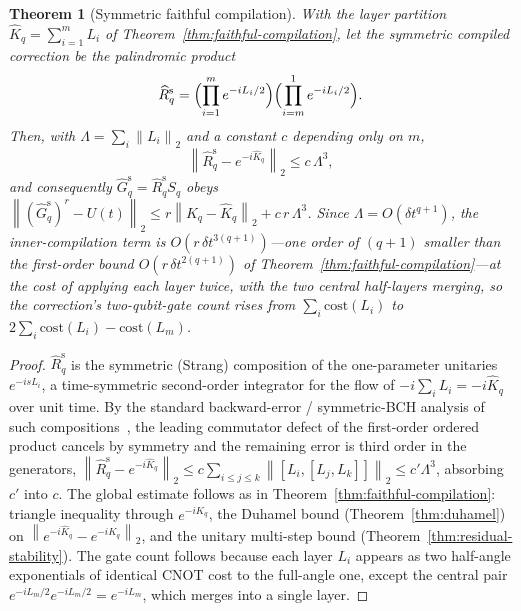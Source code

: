 \documentclass[aps,prresearch,reprint,superscriptaddress,nofootinbib,amsmath,amssymb]{revtex4-2}
\newcommand{\norm}[1]{\left\lVert #1 \right\rVert}
\newcommand{\dt}{\delta t}
\newtheorem{theorem}{Theorem}
\begin{document}
\begin{theorem}[Symmetric faithful compilation]
\label{thm:symmetric-compilation}
With the layer partition $\widehat K_q=\sum_{i=1}^{m}L_i$ of Theorem~\ref{thm:faithful-compilation}, let the \emph{symmetric} compiled correction be the palindromic product
\begin{equation}
    \widehat R_q^{\mathrm{s}}=\Bigl(\prod_{i=1}^{m}e^{-iL_i/2}\Bigr)\Bigl(\prod_{i=m}^{1}e^{-iL_i/2}\Bigr).
\end{equation}
Then, with $\Lambda=\sum_i\norm{L_i}_2$ and a constant $c$ depending only on $m$,
\begin{equation}
    \norm{\widehat R_q^{\mathrm{s}}-e^{-i\widehat K_q}}_2\leq c\,\Lambda^3 ,
\end{equation}
and consequently $\widehat G_q^{\mathrm{s}}=\widehat R_q^{\mathrm{s}}S_q$ obeys $\norm{(\widehat G_q^{\mathrm{s}})^{r}-U(t)}_2\leq r\norm{K_q-\widehat K_q}_2+c\,r\,\Lambda^3$. Since $\Lambda=O(\dt^{q+1})$, the inner-compilation term is $O(r\,\dt^{3(q+1)})$---one order of $(q+1)$ smaller than the first-order bound $O(r\,\dt^{2(q+1)})$ of Theorem~\ref{thm:faithful-compilation}---at the cost of applying each layer twice, with the two central half-layers merging, so the correction's two-qubit-gate count rises from $\sum_i\mathrm{cost}(L_i)$ to $2\sum_i\mathrm{cost}(L_i)-\mathrm{cost}(L_m)$.
\end{theorem}

\begin{proof}
$\widehat R_q^{\mathrm{s}}$ is the symmetric (Strang) composition of the one-parameter unitaries $e^{-isL_i}$, a time-symmetric second-order integrator for the flow of $-i\sum_iL_i=-i\widehat K_q$ over unit time. By the standard backward-error / symmetric-BCH analysis of such compositions~\cite{blanes2009}, the leading commutator defect of the first-order ordered product cancels by symmetry and the remaining error is third order in the generators, $\norm{\widehat R_q^{\mathrm{s}}-e^{-i\widehat K_q}}_2\leq c\sum_{i\leq j\leq k}\norm{[L_i,[L_j,L_k]]}_2\leq c'\Lambda^3$, absorbing $c'$ into $c$. The global estimate follows as in Theorem~\ref{thm:faithful-compilation}: triangle inequality through $e^{-i\widehat K_q}$, the Duhamel bound (Theorem~\ref{thm:duhamel}) on $\norm{e^{-i\widehat K_q}-e^{-iK_q}}_2$, and the unitary multi-step bound (Theorem~\ref{thm:residual-stability}). The gate count follows because each layer $L_i$ appears as two half-angle exponentials of identical CNOT cost to the full-angle one, except the central pair $e^{-iL_m/2}e^{-iL_m/2}=e^{-iL_m}$, which merges into a single layer.
\end{proof}
\end{document}
